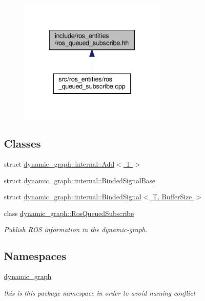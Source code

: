 \begin{figure}[H]
\begin{center}
\leavevmode
\includegraphics[width=211pt]{ros__queued__subscribe_8hh__dep__incl}
\end{center}
\end{figure}
\subsection*{Classes}
\begin{DoxyCompactItemize}
\item 
struct \hyperlink{structdynamic__graph_1_1internal_1_1Add}{dynamic\+\_\+graph\+::internal\+::\+Add$<$ T $>$}
\item 
struct \hyperlink{structdynamic__graph_1_1internal_1_1BindedSignalBase}{dynamic\+\_\+graph\+::internal\+::\+Binded\+Signal\+Base}
\item 
struct \hyperlink{structdynamic__graph_1_1internal_1_1BindedSignal}{dynamic\+\_\+graph\+::internal\+::\+Binded\+Signal$<$ T, Buffer\+Size $>$}
\item 
class \hyperlink{classdynamic__graph_1_1RosQueuedSubscribe}{dynamic\+\_\+graph\+::\+Ros\+Queued\+Subscribe}
\begin{DoxyCompactList}\small\item\em Publish R\+OS information in the dynamic-\/graph. \end{DoxyCompactList}\end{DoxyCompactItemize}
\subsection*{Namespaces}
\begin{DoxyCompactItemize}
\item 
 \hyperlink{namespacedynamic__graph}{dynamic\+\_\+graph}
\begin{DoxyCompactList}\small\item\em this is this package namespace in order to avoid naming conflict \end{DoxyCompactList}\end{DoxyCompactItemize}
